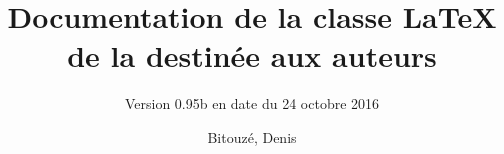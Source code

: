\documentclass{gztarticle}
\begin{document}
\title[short=Documentation de la classe de la \emph{Gazette} destinée aux
auteurs]{Documentation de la classe \LaTeX{} de la \gzt*{} destinée aux
  auteurs}
\subtitle[short=Version 0.95b (24 octobre 2016)]{\Large Version 0.95b en date du 24 octobre 2016}
%
\author[%
affiliation={%
  Université du Littoral Côte d'Opale, Laboratoire de mathématiques pures et
  appliquées%
},%
photo=denis,%
email=denis.bitouze@lmpa.univ-littoral.fr,%
webpage=http://gte.univ-littoral.fr/members/dbitouze/pub/latex/,%
]{Bitouzé, Denis}
%
\maketitle*
%
\localtableofcontents
%




%
\printindex
%
\printbibliography
\end{document}
